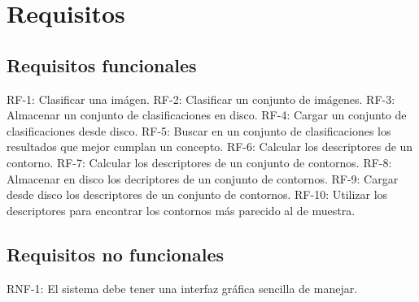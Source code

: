 \section{Requisitos}

\subsection{Requisitos funcionales}

RF-1: Clasificar una imágen.
RF-2: Clasificar un conjunto de imágenes.
RF-3: Almacenar un conjunto de clasificaciones en disco.
RF-4: Cargar un conjunto de clasificaciones desde disco.
RF-5: Buscar en un conjunto de clasificaciones los resultados que mejor cumplan un concepto.
RF-6: Calcular los descriptores de un contorno.
RF-7: Calcular los descriptores de un conjunto de contornos.
RF-8: Almacenar en disco los decriptores de un conjunto de contornos.
RF-9: Cargar desde disco los descriptores de un conjunto de contornos.
RF-10: Utilizar los descriptores para encontrar los contornos más parecido al de muestra.
\subsection{Requisitos no funcionales}

RNF-1: El sistema debe tener una interfaz gráfica sencilla de manejar.

